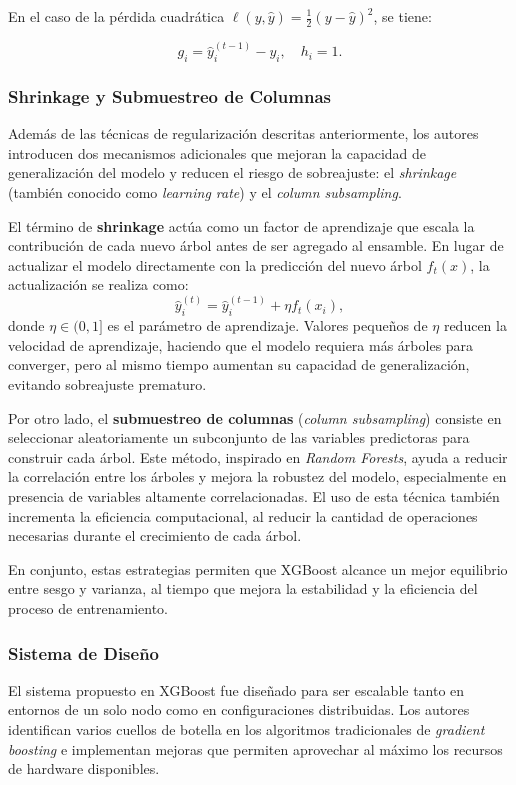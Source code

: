 \documentclass[12pt,letterpaper]{article}
\begin{document}
En el caso de la pérdida cuadrática \( \ell(y, \hat{y}) = \frac{1}{2}(y - \hat{y})^2 \), se tiene:

\[
g_i = \hat{y}_i^{(t-1)} - y_i, \quad h_i = 1.
\]

\subsubsection{Shrinkage y Submuestreo de Columnas}
Además de las técnicas de regularización descritas anteriormente, los autores \cite{chen2016xgboost} introducen dos mecanismos adicionales que mejoran la capacidad de generalización del modelo y reducen el riesgo de sobreajuste: el \textit{shrinkage} (también conocido como \textit{learning rate}) y el \textit{column subsampling}.

El término de \textbf{shrinkage} actúa como un factor de aprendizaje que escala la contribución de cada nuevo árbol antes de ser agregado al ensamble. En lugar de actualizar el modelo directamente con la predicción del nuevo árbol \( f_t(x) \), la actualización se realiza como:
\begin{equation}
    \hat{y}_i^{(t)} = \hat{y}_i^{(t-1)} + \eta f_t(x_i),
\end{equation}
donde \( \eta \in (0,1] \) es el parámetro de aprendizaje. Valores pequeños de \( \eta \) reducen la velocidad de aprendizaje, haciendo que el modelo requiera más árboles para converger, pero al mismo tiempo aumentan su capacidad de generalización, evitando sobreajuste prematuro.

Por otro lado, el \textbf{submuestreo de columnas} (\textit{column subsampling}) consiste en seleccionar aleatoriamente un subconjunto de las variables predictoras para construir cada árbol. Este método, inspirado en \textit{Random Forests}, ayuda a reducir la correlación entre los árboles y mejora la robustez del modelo, especialmente en presencia de variables altamente correlacionadas. El uso de esta técnica también incrementa la eficiencia computacional, al reducir la cantidad de operaciones necesarias durante el crecimiento de cada árbol.

En conjunto, estas estrategias permiten que XGBoost alcance un mejor equilibrio entre sesgo y varianza, al tiempo que mejora la estabilidad y la eficiencia del proceso de entrenamiento.

\subsubsection{Sistema de Diseño}
El sistema propuesto en XGBoost fue diseñado para ser escalable tanto en entornos de un solo nodo como en configuraciones distribuidas. Los autores \cite{chen2016xgboost} identifican varios cuellos de botella en los algoritmos tradicionales de \textit{gradient boosting} e implementan mejoras que permiten aprovechar al máximo los recursos de hardware disponibles.
\end{document}
